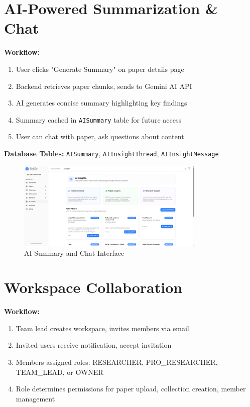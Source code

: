 \section{AI-Powered Summarization \& Chat}

\textbf{Workflow:}
\begin{enumerate}[leftmargin=*,topsep=3pt,itemsep=2pt]
    \item User clicks "Generate Summary" on paper details page
    \item Backend retrieves paper chunks, sends to Gemini AI API
    \item AI generates concise summary highlighting key findings
    \item Summary cached in \texttt{AISummary} table for future access
    \item User can chat with paper, ask questions about content
\end{enumerate}

\textbf{Database Tables:} \texttt{AISummary}, \texttt{AIInsightThread}, \texttt{AIInsightMessage}

\begin{figure}[H]
\centering
\includegraphics[width=0.8\textwidth]{images/screenshots/ai_insights.png}
\caption{AI Summary and Chat Interface}
\label{fig:ai}
\end{figure}

\section{Workspace Collaboration}

\textbf{Workflow:}
\begin{enumerate}[leftmargin=*,topsep=3pt,itemsep=2pt]
    \item Team lead creates workspace, invites members via email
    \item Invited users receive notification, accept invitation
    \item Members assigned roles: RESEARCHER, PRO\_RESEARCHER, TEAM\_LEAD, or OWNER
    \item Role determines permissions for paper upload, collection creation, member management
\end{enumerate}

